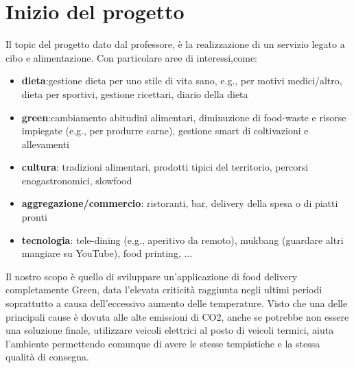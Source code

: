 \documentclass{article}
\begin{document}
\section{Inizio del progetto}\par
Il topic del progetto dato dal professore, è la realizzazione di un servizio legato a cibo e alimentazione. Con particolare aree di interessi,come: \par
\begin{itemize}
    \item \textbf{dieta}:gestione dieta per uno stile di vita sano, e.g., per motivi medici/altro, dieta per sportivi, gestione ricettari, diario della dieta \par
    \item \textbf{green}:cambiamento abitudini alimentari, diminuzione di food-waste e risorse impiegate (e.g., per produrre carne), gestione smart di coltivazioni e allevamenti \par
    \item \textbf{cultura}: tradizioni alimentari, prodotti tipici del territorio, percorsi enogastronomici, slowfood\par
    \item \textbf{aggregazione/commercio}: ristoranti, bar, delivery della spesa o di piatti pronti \par
    \item \textbf{tecnologia}: tele-dining (e.g., aperitivo da remoto), mukbang (guardare altri mangiare su YouTube), food printing, ... \par
\end{itemize}
\vspace{1cm}



     \par
    Il nostro scopo è quello di sviluppare un’applicazione di food delivery completamente Green, data l'elevata criticità raggiunta negli ultimi periodi soprattutto a causa dell'eccessivo aumento delle temperature. Visto che una delle principali cause è dovuta alle alte emissioni di CO2, anche se potrebbe non essere una soluzione finale, utilizzare veicoli elettrici al posto di veicoli termici, aiuta l’ambiente permettendo comunque di avere le stesse tempistiche e la stessa qualità di consegna.
    \vspace{1cm}
    
\end{document}
